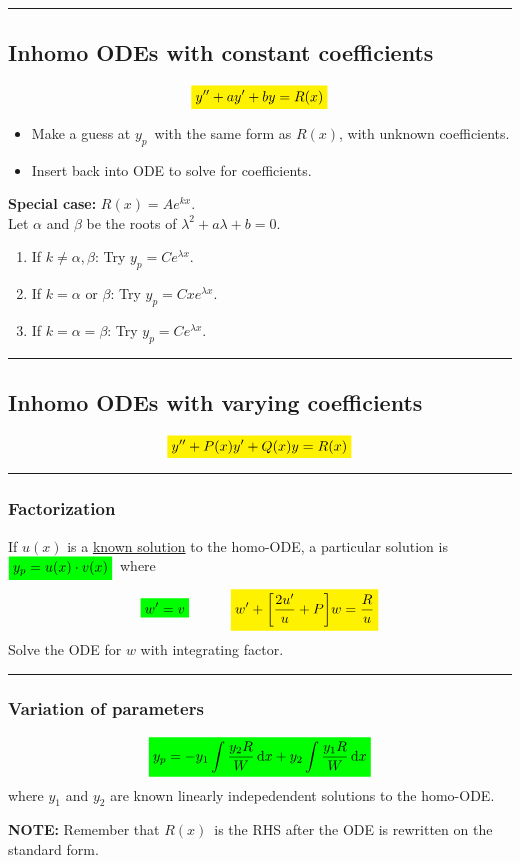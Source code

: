 \documentclass[10pt,a4paper]{article}
\renewcommand{\exp}{e^}
\newcommand{\holine}{\rule{286pt}{1pt}}
\newcommand{\yl}[1]{\colorbox{yellow}{$\displaystyle #1$}}
\newcommand{\gr}[1]{\colorbox{green}{$\displaystyle #1$}}
\begin{document}
\begin{multicols}{2}
\holine
\subsection*{Inhomo ODEs with constant coefficients}
\[\yl{
    y'' + ay' + by = R(x)
}\]
\begin{itemize}
    \item Make a guess at $y_p$ with the same form as $R(x)$, with unknown coefficients.
    \item Insert back into ODE to solve for coefficients.
\end{itemize}
\textbf{Special case:} $R(x) = A\exp{kx}$.\\
Let $\alpha$ and $\beta $ be the roots of $\lambda^2 + a\lambda + b = 0$.
\begin{enumerate}
    \item If $k\neq \alpha,\beta$: Try $y_p = C\exp{\lambda x}$.
    \item If $k = \alpha \text{ or } \beta$: Try $y_p = Cx\exp{\lambda x}$.
    \item If $k = \alpha = \beta$: Try $y_p = C\exp{\lambda x}$.
\end{enumerate}


\holine
\subsection*{Inhomo ODEs with varying coefficients}
\[\yl{
    y'' + P(x)y' + Q(x)y = R(x)
}\]

\holine
\subsubsection*{Factorization}
If $u(x)$ is a \underline{known solution} to the homo-ODE, a particular solution is $\gr{y_p = u(x)\cdot v(x)}$ where
\[
    \gr{w' = v} \quad\quad\quad \yl{w' + \qty[\frac{2u'}{u} + P]w = \frac{R}{u}}
\]
Solve the ODE for $w$ with integrating factor.

\holine
\subsubsection*{Variation of parameters}
\[\gr{
    y_p = -y_1\int\frac{y_2R}{W}\dd{x} + y_2 \int\frac{y_1R}{W}\dd{x}
}\]
where $y_1$ and $y_2$ are known linearly indepedendent solutions to the homo-ODE.

\textbf{NOTE:} Remember that $R(x)$ is the RHS after the ODE is rewritten on the standard form.









\end{multicols}
\end{document}
